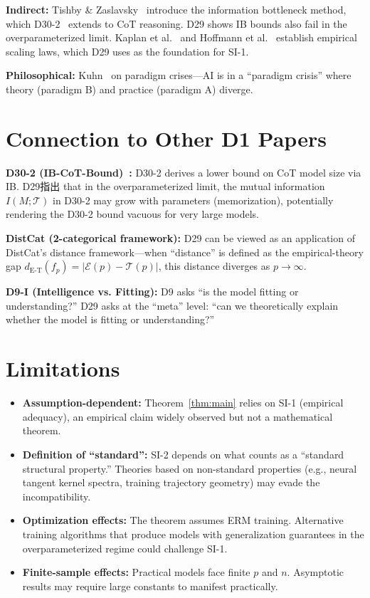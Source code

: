 \documentclass[12pt]{article}
\theoremstyle{definition}
\theoremstyle{remark}
\begin{document}
\textbf{Indirect:} Tishby \& Zaslavsky~\cite{tishby2015information} introduce the information bottleneck method, which D30-2~\cite{lu2026-d30-2} extends to CoT reasoning. D29 shows IB bounds also fail in the overparameterized limit. Kaplan et al.~\cite{kaplan2020scaling} and Hoffmann et al.~\cite{hoffmann2022training} establish empirical scaling laws, which D29 uses as the foundation for SI-1.

\textbf{Philosophical:} Kuhn~\cite{kuhn1962structure} on paradigm crises---AI is in a ``paradigm crisis'' where theory (paradigm B) and practice (paradigm A) diverge.

\section{Connection to Other D1 Papers}

\textbf{D30-2 (IB-CoT-Bound)~\cite{lu2026-d30-2}:} D30-2 derives a lower bound on CoT model size via IB. D29指出 that in the overparameterized limit, the mutual information $I(M; \mathcal{T})$ in D30-2 may grow with parameters (memorization), potentially rendering the D30-2 bound vacuous for very large models.

\textbf{DistCat (2-categorical framework):} D29 can be viewed as an application of DistCat's distance framework---when ``distance'' is defined as the empirical-theory gap $d_{\text{E-T}}(f_p) = |\mathcal{E}(p) - \mathcal{T}(p)|$, this distance diverges as $p \to \infty$.

\textbf{D9-I (Intelligence vs. Fitting):} D9 asks ``is the model fitting or understanding?'' D29 asks at the ``meta'' level: ``can we theoretically explain whether the model is fitting or understanding?''

\section{Limitations}

\begin{itemize}
  \item \textbf{Assumption-dependent:} Theorem~\ref{thm:main} relies on SI-1 (empirical adequacy), an empirical claim widely observed but not a mathematical theorem.
  \item \textbf{Definition of ``standard'':} SI-2 depends on what counts as a ``standard structural property.'' Theories based on non-standard properties (e.g., neural tangent kernel spectra, training trajectory geometry) may evade the incompatibility.
  \item \textbf{Optimization effects:} The theorem assumes ERM training. Alternative training algorithms that produce models with generalization guarantees in the overparameterized regime could challenge SI-1.
  \item \textbf{Finite-sample effects:} Practical models face finite $p$ and $n$. Asymptotic results may require large constants to manifest practically.
\end{itemize}
\end{document}
